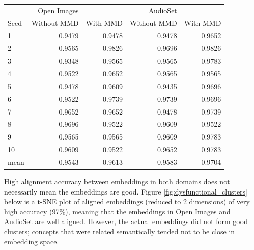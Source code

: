 \begin{table}[H]
\centering
\begin{tabular}{lrrrr}
  \toprule
       &    Open Images&               &  AudioSet    &            \\
{Seed} &    Without MMD &   With MMD   &  Without MMD &   With MMD \\
\midrule
1    &       0.9479 &        0.9478&    0.9478 &  0.9652  \\
2    &       0.9565 &        0.9826&    0.9696 &  0.9826  \\
3    &       0.9348 &        0.9565&    0.9565 &  0.9783  \\
4    &       0.9522 &        0.9652&    0.9565 &  0.9565  \\
5    &       0.9478 &        0.9609&    0.9435 &  0.9696  \\
6    &       0.9522 &        0.9739&    0.9739 &  0.9696  \\
7    &       0.9652 &        0.9652&    0.9478 &  0.9739  \\
8    &       0.9696 &        0.9522&    0.9609 &  0.9522  \\
9    &       0.9565 &        0.9565&    0.9609 &  0.9783  \\
10   &       0.9609 &        0.9522&    0.9652 &  0.9783  \\
\midrule                                                         
mean &       0.9543 &        0.9613 &   0.9583 &  0.9704  \\
\bottomrule
\end{tabular}
\end{table}

High alignment accuracy between embeddings in both domains does not necessarily mean the embeddings are good. Figure \ref{fig:dysfunctional_clusters} below is a t-SNE plot of aligned embeddings (reduced to 2 dimensions) of very high accuracy (97\%), meaning that the embeddings in Open Images and AudioSet are well aligned. However, the actual embeddings did not form good clusters; concepts that were related semantically tended not to be close in embedding space. 

